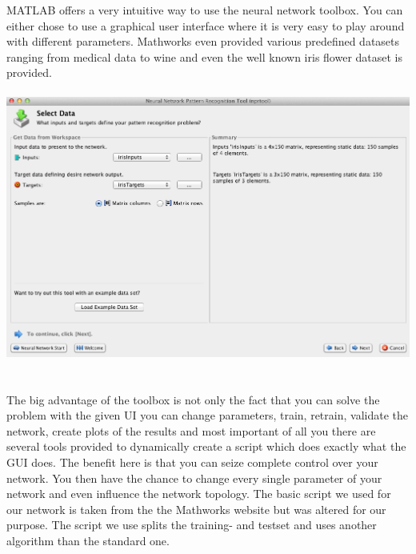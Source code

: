 \documentclass[subfigure,epsfig,fleqn,float,ausarbeitung]{scrartcl}
\begin{document}
MATLAB offers a very intuitive way to use the neural network toolbox. You can either chose to use a graphical user interface where it is very easy to play around with different parameters. Mathworks even provided various predefined datasets ranging from medical data to wine and even the well known iris flower dataset is provided. 
~\\ ~\\
\includegraphics[scale=0.45]{img/nn/toolbox_pedef_data.png}
~\\ ~\\
The big advantage of the toolbox is not only the fact that you can solve the problem with the given UI you can change parameters, train, retrain, validate the network, create plots of the results and most important of all you there are several tools provided to dynamically create a script which does exactly what the GUI does. The benefit here is that you can seize complete control over your network. You then have the chance to change every single parameter of your network and even influence the network topology. The basic script we used for our network is taken from the the Mathworks website but was altered for our purpose. The script we use splits the training- and testset and uses another algorithm than the standard one. 

\lstset{language=Matlab, breaklines=true}
\end{document}
